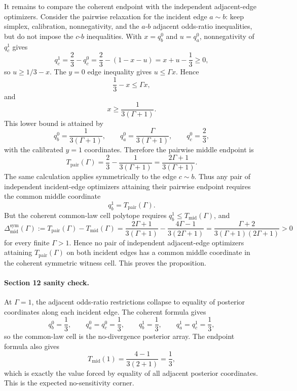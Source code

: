 It remains to compare the coherent endpoint with the independent adjacent-edge optimizers.  Consider the pairwise relaxation for the incident edge \(a\sim b\): keep simplex, calibration, nonnegativity, and the \(a\)-\(b\) adjacent odds-ratio inequalities, but do not impose the \(c\)-\(b\) inequalities.  With \(x=q_b^0\) and \(u=q_a^0\), nonnegativity of \(q_c^1\) gives
\[
  q_c^1=\frac23-q_c^0
  =\frac23-(1-x-u)
  =x+u-\frac13\ge 0,
\]
so \(u\ge 1/3-x\).  The \(y=0\) edge inequality gives \(u\le \Gamma x\).  Hence
\[
  \frac13-x\le \Gamma x,
\]
and
\[
  x\ge \frac{1}{3(\Gamma+1)}.
\]
This lower bound is attained by
\[
  q_b^0=\frac{1}{3(\Gamma+1)},\qquad
  q_a^0=\frac{\Gamma}{3(\Gamma+1)},\qquad
  q_c^0=\frac23,
\]
with the calibrated \(y=1\) coordinates.  Therefore the pairwise middle endpoint is
\[
  T_{\mathrm{pair}}(\Gamma)
  =
  \frac23-\frac{1}{3(\Gamma+1)}
  =
  \frac{2\Gamma+1}{3(\Gamma+1)}.
\]
The same calculation applies symmetrically to the edge \(c\sim b\).  Thus any pair of independent incident-edge optimizers attaining their pairwise endpoint requires the common middle coordinate
\[
  q_b^1=T_{\mathrm{pair}}(\Gamma).
\]
But the coherent common-law cell polytope requires \(q_b^1\le T_{\mathrm{mid}}(\Gamma)\), and
\[
  \Delta_{\mathrm{mid}}^{\mathrm{sym}}(\Gamma)
  :=
  T_{\mathrm{pair}}(\Gamma)-T_{\mathrm{mid}}(\Gamma)
  =
  \frac{2\Gamma+1}{3(\Gamma+1)}
  -\frac{4\Gamma-1}{3(2\Gamma+1)}
  =
  \frac{\Gamma+2}{3(\Gamma+1)(2\Gamma+1)}
  >0
\]
for every finite \(\Gamma>1\).  Hence no pair of independent adjacent-edge optimizers attaining \(T_{\mathrm{pair}}(\Gamma)\) on both incident edges has a common middle coordinate in the coherent symmetric witness cell.  This proves the proposition.

\paragraph{Section 12 sanity check.}
At \(\Gamma=1\), the adjacent odds-ratio restrictions collapse to equality of posterior coordinates along each incident edge.  The coherent formula gives
\[
  q_b^0=\frac13,\qquad q_a^0=q_c^0=\frac13,\qquad
  q_b^1=\frac13,\qquad q_a^1=q_c^1=\frac13,
\]
so the common-law cell is the no-divergence posterior array.  The endpoint formula also gives
\[
  T_{\mathrm{mid}}(1)=\frac{4-1}{3(2+1)}=\frac13,
\]
which is exactly the value forced by equality of all adjacent posterior coordinates.  This is the expected no-sensitivity corner.

